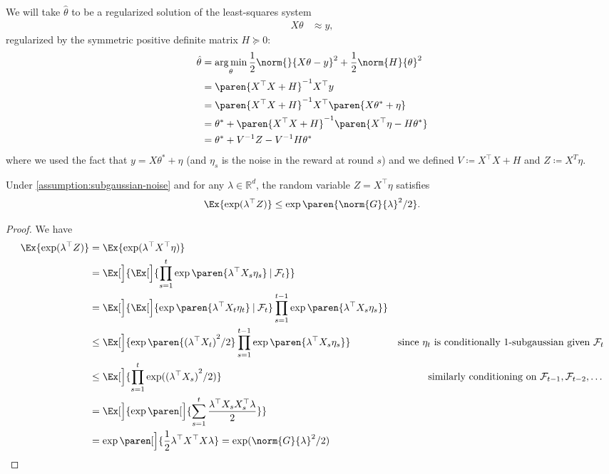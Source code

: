 \documentclass{article}
\newcommand{\defeq}{\coloneq}
\newcommand{\inv}[1]{#1^{-1}}
\newcommand{\Real}{\mathds{R}}
\newcommand{\argmin}{\operatorname*{arg\,min}}
\newcommand\given[1][\delimsize]{%
  \providecommand{\delimsize}{}
  \nonscript\:#1\vert\allowbreak\nonscript\:\mathopen{}
}
\DeclarePairedDelimiter{\paren}()
\providecommand\transp{\top}
\let\transpsymbol\transp
\renewcommand{\transp}[1]{#1^\transpsymbol}
\begin{document}
We will take $\hat{\theta}$ to be a regularized solution of the
least-squares system
\begin{align*}
  X\theta &\approx y,
\end{align*}
regularized by the symmetric positive definite matrix $H \succeq 0$:
\begin{align*}
  \hat{\theta} &= \argmin_\theta \frac{1}{2}\norm{}{X\theta - y}^2 + \frac{1}{2}\norm{H}{\theta}^2 \\
               &= \inv{\paren{\transp{X}X + H}} \transp{X}y \\
               &= \inv{\paren{\transp{X}X + H}} \transp{X} \paren{X\theta^* + \eta} \\
               &= \theta^* + \inv{\paren{\transp{X}X + H}}\paren{\transp{X}\eta - H\theta^*} \\
               &= \theta^* + \inv{V}Z - \inv{V}H\theta^*
\end{align*}
where we used the fact that $y = X\theta^* + \eta$ (and $\eta_s$ is the
noise in the reward at round $s$) and we defined $V \defeq \transp{X}X
+ H$ and $Z\defeq X^T\eta$.

\begin{lemma}\label{lemma:subgaussian-z}
  Under \cref{assumption:subgaussian-noise} and for any
$\lambda\in\Real^d$, the random variable $Z = \transp{X}\eta$ satisfies
  \begin{align*}
    \Ex{\exp(\transp{\lambda}Z)} \le \exp\paren{\norm{G}{\lambda}^2/2}.
  \end{align*}

  \begin{proof}
    We have
    \begin{align*}
      \Ex{\exp(\transp{\lambda}Z)}
      &= \Ex{\exp(\transp{\lambda}\transp{X}\eta)} \\
      &= \Ex[\Big]{\Ex[\Big]{\prod_{s=1}^t \exp\paren{\transp{\lambda}X_s\eta_s} \given \mathcal{F}_t}} \\
      &= \Ex[\Big]{\Ex[\Big]{\exp\paren{\transp{\lambda}X_t\eta_t} \given \mathcal{F}_t} \prod_{s=1}^{t-1} \exp\paren{\transp{\lambda}X_s\eta_s}} \\
      &\le \Ex[\Big]{\exp\paren{{(\transp{\lambda}X_t)}^2/2}
        \prod_{s=1}^{t-1} \exp\paren{\transp{\lambda}X_s\eta_s}}
      &\text{since $\eta_t$ is conditionally 1-subgaussian given $\mathcal{F}_t$}\\
      &\le \Ex[\Big]{\prod_{s=1}^t\exp({(\transp{\lambda}X_s)}^2/2)}
      &\text{similarly conditioning on $\mathcal{F}_{t-1},\mathcal{F}_{t-2},\dotsc$}\\
      &= \Ex[\Big]{\exp\paren[\Big]{\sum_{s=1}^t\frac{\transp{\lambda}X_s\transp{X_s}\lambda}{2}}} \\
      &= \exp\paren[\Big]{\frac{1}{2}\transp{\lambda}\transp{X}X\lambda}
        = \exp(\norm{G}{\lambda}^2/2)
      &\qedhere
    \end{align*}
  \end{proof}
\end{lemma}
\end{document}
